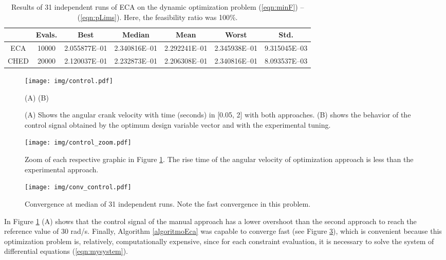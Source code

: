 \documentclass[12pt,letterpape]{article}
\begin{document}
\begin{table}[!ht]
	\centering
	\begin{tabular}{ccccccc}
		\hline
		& {\bf Evals.} & {\bf Best} & {\bf Median} & {\bf Mean} & {\bf Worst} & {\bf Std.} \\ \hline
		ECA & 10000 & 2.055877E--01 & 2.340816E--01 & 2.292241E--01 & 2.345938E--01 & 9.315045E--03 \\ \hline
		CHED & 20000 & 2.120037E--01 & 2.232873E--01 & 2.206308E--01 & 2.340816E--01 & 8.093537E--03 \\ \hline
	\end{tabular}
	\caption{Results of 31 independent runs of ECA on the dynamic optimization problem (\ref{eqn:minF}) -- (\ref{eqn:pLims}). Here, the feasibility ratio was 100\%.}
	\label{tab:res2}
\end{table}
% 
% 
% 
% 
\begin{figure}[!ht]
	\centering
	\texttt{[image: img/control.pdf]}
	\begin{center}
		(A) \hspace{0.4\linewidth} (B)
	\end{center}
	\caption{(A) Shows the angular crank velocity with time (seconds) in [0.05, 2]
	with both approaches. (B) shows the behavior of the control signal obtained
	by the optimum design variable vector and with the experimental tuning.}
	\label{fig:tunning}
\end{figure}
% 
% 
% 
\begin{figure}[!ht]
	\centering
	\texttt{[image: img/control\_zoom.pdf]}
	\caption{Zoom of each respective graphic in Figure \ref{fig:tunning}. The rise time of the angular velocity of optimization approach is less than the experimental approach.}
	\label{fig:tunningZoom}
\end{figure}
% 
% 
\begin{figure}[!ht]
	\centering
	\texttt{[image: img/conv\_control.pdf]}
	\caption{Convergence at median of 31 independent runs. Note the fast convergence
	in this problem.}
	\label{fig:convMedian2}
\end{figure}

In Figure \ref{fig:tunning} (A) shows that the control signal of the manual approach has a lower overshoot than the second approach to reach the reference value of 30 rad/s.
% 
Finally, Algorithm \ref{algoritmoEca} was capable to converge fast (see Figure \ref{fig:convMedian2}), which is convenient because this optimization problem is, relatively,
computationally expensive, since for each constraint evaluation, it is necessary to solve the system of differential equations (\ref{eqn:mysystem}).
\end{document}
